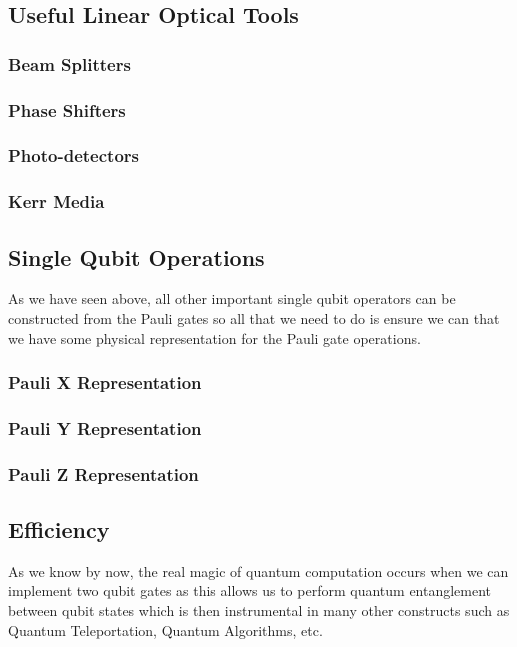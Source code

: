 \subsection{Useful Linear Optical Tools}
\subsubsection{Beam Splitters}
\subsubsection{Phase Shifters}
\subsubsection{Photo-detectors}
\subsubsection{Kerr Media}


\subsection{Single Qubit Operations}
As we have seen above, all other important single qubit operators can be constructed from the Pauli gates so all that we need to do is ensure we can that we have some physical representation for the Pauli gate operations.
\subsubsection{Pauli X Representation}
\subsubsection{Pauli Y Representation}
\subsubsection{Pauli Z Representation}


\subsection{Efficiency}
As we know by now, the real magic of quantum computation occurs when we can implement two qubit gates as this allows us to perform quantum entanglement between qubit states which is then instrumental in many other constructs such as Quantum Teleportation, Quantum Algorithms, etc.

